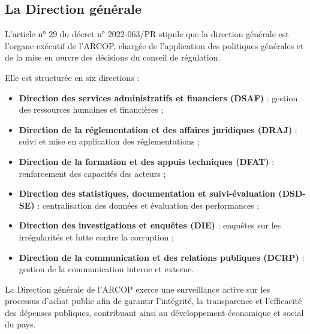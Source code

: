 \subsection{La Direction générale}
L’article n° 29 du décret n° 2022-063/PR stipule que la direction générale est l'organe exécutif de l’ARCOP, chargée de l’application des politiques générales et de la mise en œuvre des décisions du conseil de régulation.

Elle est structurée en six directions :
\begin{itemize}
    \item \textbf{Direction des services administratifs et financiers (DSAF)} : gestion des ressources humaines et financières ;
    \item \textbf{Direction de la réglementation et des affaires juridiques (DRAJ)} : suivi et mise en application des réglementations ;
    \item \textbf{Direction de la formation et des appuis techniques (DFAT)} : renforcement des capacités des acteurs ;
    \item \textbf{Direction des statistiques, documentation et suivi-évaluation (DSD-SE)} : centralisation des données et évaluation des performances ;
    \item \textbf{Direction des investigations et enquêtes (DIE)} : enquêtes sur les irrégularités et lutte contre la corruption ;
    \item \textbf{Direction de la communication et des relations publiques (DCRP)} : gestion de la communication interne et externe.
\end{itemize}

La Direction générale de l’ARCOP exerce une surveillance active sur les processus d'achat public afin de garantir l'intégrité, la transparence et l'efficacité des dépenses publiques, contribuant ainsi au développement économique et social du pays.



\clearpage